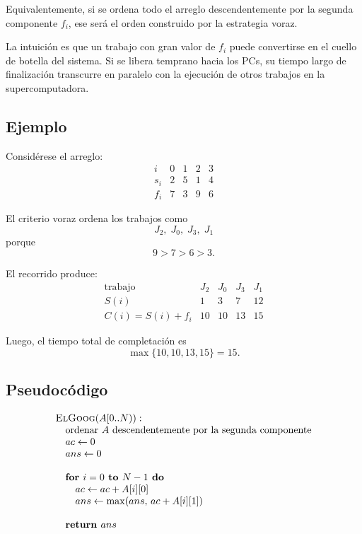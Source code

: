 \documentclass[11pt]{article}
\begin{document}
Equivalentemente, si se ordena todo el arreglo descendentemente por la segunda
componente \(f_i\), ese será el orden construido por la estrategia voraz.

La intuición es que un trabajo con gran valor de \(f_i\) puede convertirse en el cuello de
botella del sistema. Si se libera temprano hacia los PCs, su tiempo largo de finalización
transcurre en paralelo con la ejecución de otros trabajos en la supercomputadora.

\subsection*{Ejemplo}

Considérese el arreglo:
\[
\begin{array}{c|cccc}
i & 0 & 1 & 2 & 3\\
\hline
s_i & 2 & 5 & 1 & 4\\
f_i & 7 & 3 & 9 & 6
\end{array}
\]

El criterio voraz ordena los trabajos como
\[
J_2,\; J_0,\; J_3,\; J_1
\]
porque
\[
9 > 7 > 6 > 3.
\]

El recorrido produce:
\[
\begin{array}{c|cccc}
\text{trabajo} & J_2 & J_0 & J_3 & J_1\\
\hline
S(i) & 1 & 3 & 7 & 12\\
C(i)=S(i)+f_i & 10 & 10 & 13 & 15
\end{array}
\]

Luego, el tiempo total de completación es
\[
\max\{10,10,13,15\}=15.
\]

\subsection*{Pseudocódigo}

\[
\begin{array}{l}
\textsc{ElGoog}(A[0..N)):\\
\quad \text{ordenar } A \text{ descendentemente por la segunda componente} \\
\quad ac \gets 0 \\
\quad ans \gets 0 \\
\\
\quad \textbf{for } i = 0 \textbf{ to } N-1 \textbf{ do}\\
\quad \quad ac \gets ac + A[i][0] \\
\quad \quad ans \gets \max(ans,\, ac + A[i][1]) \\
\\
\quad \textbf{return } ans
\end{array}
\]
\end{document}
